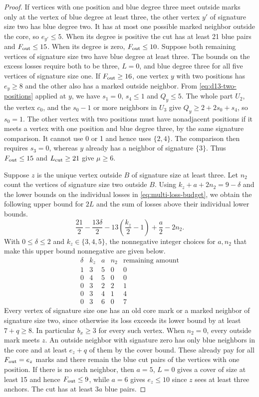 \documentclass[preprint,11pt,numbers]{elsarticle-arxiv}
\numberwithin{equation}{section}
\theoremstyle{definition}
\begin{document}
\begin{proof}
If vertices with one position and blue degree three meet outside marks
only at the vertex of blue degree at least three, the other vertex $y'$
of signature size two has blue degree two. It has at most one possible
marked neighbor outside the core, so $e_{y'}\le5$. When its degree is positive the cut has at least 21 blue
pairs and $F_{\rm out}\le15$. When its degree is zero, $F_{\rm out}\le10$.
Suppose both remaining vertices of signature size two have blue
degree at least three. The bounds on the excess losses require
both to be three, $L=0$, and blue degree three for all five
vertices of signature size one. If $F_{\rm out}\ge16$, one vertex $y$
with two positions has $e_y\ge8$ and the other also has a marked
outside neighbor. From \eqref{eq:d13-two-positions} applied at $y$,
we have $s_1=0$, $s_4\le1$ and $Q_y\le5$. The whole part $U_2$,
the vertex $c_0$, and the $s_0-1$ or more neighbors in $U_3$ give
$Q_y\ge2+2s_0+s_4$, so $s_0=1$. The other vertex with two positions
must have nonadjacent positions if it meets a vertex with one
position and blue degree three, by the same signature comparison.
It cannot use 0 or 1 and hence uses $\{2,4\}$. The comparison then
requires $s_3=0$, whereas $y$ already has a neighbor of signature
$\{3\}$. Thus $F_{\rm out}\le15$ and $L_{\rm cut}\ge21$ give
$\mu\ge6$.

Suppose $z$ is the unique vertex outside $B$ of signature size
at least three. Let $n_2$ count the vertices of signature size
two outside $B$. Using $k_z+a+2n_2=9-\delta$ and the lower bounds
on the individual losses in \eqref{eq:multi-loss-budget}, we
obtain the following upper bound for $2L$ and the sum of losses
above their individual lower bounds.
\[
 \frac{21}{2}-\frac{13\delta}{2}
 -13\left(\frac{k_z}{2}-1\right)+\frac{a}{2}-2n_2 .
\]
With $0\le\delta\le2$ and $k_z\in\{3,4,5\}$, the nonnegative
integer choices for $a,n_2$ that make this upper bound nonnegative
are given below.
\[
\begin{array}{rrrrr}
 \delta& k_z&a&n_2&\text{remaining amount}\\
 1&3&5&0&0\\
 0&4&5&0&0\\
 0&3&2&2&1\\
 0&3&4&1&4\\
 0&3&6&0&7
\end{array}
\]
Every vertex of signature size one has an old core mark or a marked
neighbor of signature size two, since otherwise its loss exceeds its
lower bound by at least $7+q\ge8$. In particular $b_x\ge3$ for
every such vertex. When $n_2=0$, every outside mark meets $z$.
An outside neighbor with signature zero has only blue neighbors in
the core and at least $e_z+q$ of them by the cover bound. These
already pay for all $F_{\rm out}=e_z$ marks and there remain the
blue cut pairs of the vertices with one position. If there is
no such neighbor, then $a=5$, $L=0$ gives a cover of size at least
15 and hence $F_{\rm out}\le9$, while $a=6$ gives $e_z\le10$ since
$z$ sees at least three anchors. The cut has at least $3a$ blue pairs.


\end{proof}
\end{document}

